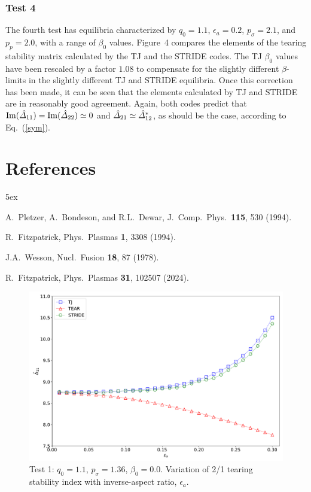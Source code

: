 \documentclass[12pt,prb,aps,notitlepage]{revtex4-1}
\begin{document}
\subsubsection{Test 4}
The fourth test has equilibria characterized by $q_0=1.1$, $\epsilon_a=0.2$, $p_\sigma = 2.1$, and $p_p=2.0$, with a range of $\beta_0$ values.  
Figure~4 compares the elements of the tearing stability matrix calculated by the TJ and the STRIDE codes. The TJ $\beta_0$ values have been rescaled
by a factor $1.08$ to compensate for the slightly different $\beta$-limits in the slightly different TJ and STRIDE equilibria. 
 Once this correction has been made, it can be seen that the elements calculated by
TJ and STRIDE are in reasonably good agreement.  Again, both codes predict that  ${\rm Im}(\hat{\mit\Delta}_{11})={\rm Im}(\hat{\mit\Delta}_{22}) \simeq 0$ and $\hat{\mit\Delta}_{21}\simeq \hat{\mit\Delta}_{12}^\ast$, as should be the case, according to Eq.~(\ref{sym}).


\section*{References}
\begin{thebibliography}{99}\baselineskip 5ex

 A.~Pletzer, A.~Bondeson, and R.L.~Dewar, J.\ Comp.\ Phys.\ {\bf 115}, 530 (1994).

 R.~Fitzpatrick, Phys.\ Plasmas {\bf 1}, 3308 (1994). 

 J.A.~Wesson, Nucl.\ Fusion {\bf 18},  87 (1978). 

 R.~Fitzpatrick, Phys.\ Plasmas {\bf 31}, 102507 (2024).

\end{thebibliography}

\newpage
\begin{figure}
\centerline{\includegraphics[width=\textwidth]{Test1.pdf}}
\caption{Test 1: $q_0=1.1$, $p_\sigma=1.36$, $\beta_0=0.0$. Variation of 2/1 tearing stability index with inverse-aspect ratio, $\epsilon_a$. }
\end{figure}
\end{document}

